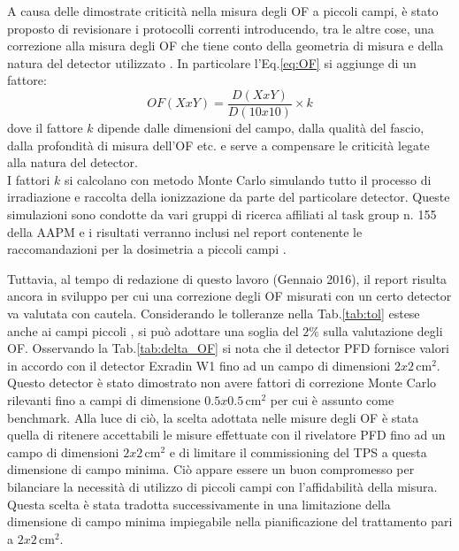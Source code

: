 A causa delle dimostrate criticità nella misura degli OF a piccoli campi, è stato proposto di revisionare i protocolli correnti introducendo, tra le altre cose, una correzione alla misura degli OF che tiene conto della geometria di misura e della natura del detector utilizzato \cite{Alfonso2008}. In particolare l'Eq.\eqref{eq:OF} si aggiunge di un fattore:
\begin{equation}
OF(XxY)=\frac{D(XxY)}{D(10x10)}\times k
\end{equation}
dove il fattore $k$ dipende dalle dimensioni del campo, dalla qualità del fascio, dalla profondità di misura dell'OF etc. e serve a compensare le criticità legate alla natura del detector.\\
I fattori $k$ si calcolano con metodo Monte Carlo simulando tutto il processo di irradiazione e raccolta della ionizzazione da parte del particolare detector. Queste simulazioni sono condotte da vari gruppi di ricerca affiliati al task group n. 155 della AAPM e i risultati verranno inclusi nel report contenente le raccomandazioni per la dosimetria a piccoli campi \cite{AAPMTG155}. 

Tuttavia, al tempo di redazione di questo lavoro (Gennaio 2016), il report risulta ancora in sviluppo per cui una correzione degli OF misurati con un certo detector va valutata con cautela. Considerando le tolleranze nella Tab.\ref{tab:tol} estese anche ai campi piccoli \cite{Low2011}, si può adottare una soglia del $2\%$ sulla valutazione degli OF. Osservando la Tab.\ref{tab:delta_OF} si nota che il detector PFD fornisce valori in accordo con il detector Exradin W1 fino ad un campo di dimensioni $2x2\,$cm$^2$. Questo detector è stato dimostrato non avere fattori di correzione Monte Carlo rilevanti fino a campi di dimensione $0.5x0.5\,$cm$^2$ \cite{Francescon2014} per cui è assunto come benchmark. Alla luce di ciò, la scelta adottata nelle misure degli OF è stata quella di ritenere accettabili le misure effettuate con il rivelatore PFD fino ad un campo di dimensioni $2x2\,$cm$^2$ e di limitare il commissioning del TPS a questa dimensione di campo minima. Ciò appare essere un buon compromesso per bilanciare la necessità di utilizzo di piccoli campi con l'affidabilità della misura. Questa scelta è stata tradotta successivamente in una limitazione della dimensione di campo minima impiegabile nella pianificazione del trattamento pari a $2x2\,$cm$^2$.

